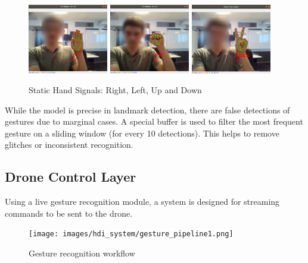 \begin{figure}[h]
    \raggedright
    \includegraphics[width=3.5cm]{images/hand_drone_interaction/up_censored.jpg}
    \includegraphics[width=3.5cm]{images/hand_drone_interaction/fist_censored.png}
    \includegraphics[width=3.5cm]{images/hand_drone_interaction/peace_censored.jpg}
    \caption{Static Hand Signals: Right, Left, Up and Down}
\end{figure}

While the model is precise in landmark detection, there are false detections of gestures due to marginal cases. A special buffer is used to filter the most frequent gesture on a sliding window (for every 10 detections). This helps to remove glitches or inconsistent recognition. %



\pagebreak
\subsection{Drone Control Layer}

Using a live gesture recognition module, a system is designed for streaming commands to be sent to the drone.

\begin{figure}[h]
  \raggedright
  \texttt{[image: images/hdi\_system/gesture\_pipeline1.png]}
  \caption{Gesture recognition workflow}
  \label{fig:handpipeline}
\end{figure}


